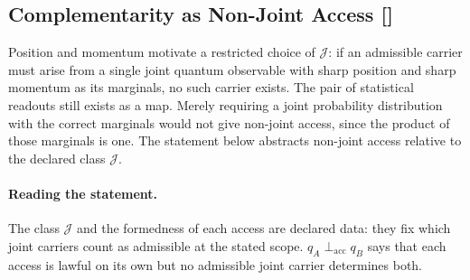 \subsection{Complementarity as Non-Joint Access [\texorpdfstring{}{F37}]}\label{sec:self-reference-limits:complementarity}

Position and momentum \citep{Bohr1928Quantum} motivate a restricted choice
of \(\mathcal J\): if an admissible carrier must arise from a single joint
quantum observable with sharp position and sharp momentum as its marginals, no
such carrier exists. The pair of statistical readouts still exists as a map.
Merely requiring a joint probability distribution with the correct marginals
would not give non-joint access, since the product of those marginals is one.
The statement below abstracts non-joint access relative to the declared class
\(\mathcal J\).

\paragraph{Reading the statement.}
The class \(\mathcal J\) and the formedness of each access are declared
data: they fix which joint carriers count as admissible at the stated
scope. \(q_A\perp_{\mathrm{acc}}q_B\) says that each access is lawful
on its own but no admissible joint carrier determines both.

